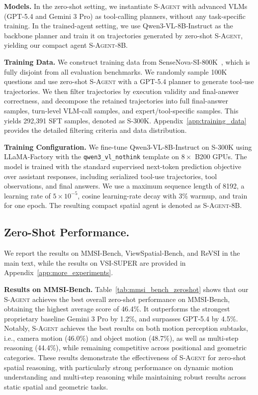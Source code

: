 \textbf{Models.} 
In the zero-shot setting, we instantiate \textsc{S-Agent} with advanced VLMs (GPT-5.4 and Gemini 3 Pro) as tool-calling planners, without any task-specific training. 
In the trained-agent setting, we use Qwen3-VL-8B-Instruct as the backbone planner and train it on trajectories generated by zero-shot \textsc{S-Agent}, yielding our compact agent \textsc{S-Agent-8B}.

\textbf{Training Data.}
We construct training data from SenseNova-SI-800K~\citep{sensenova_si}, which is fully disjoint from all evaluation benchmarks. 
We randomly sample 100K questions and use zero-shot \textsc{S-Agent} with a GPT-5.4 planner to generate tool-use trajectories.
We then filter trajectories by execution validity and final-answer correctness, and decompose the retained trajectories into full final-answer samples, turn-level VLM-call samples, and expert/tool-specific samples. 
This yields 292,391 SFT samples, denoted as \textsc{S-300K}. 
Appendix~\ref{app:training_data} provides the detailed filtering criteria and data distribution.

\textbf{Training Configuration.}
We fine-tune Qwen3-VL-8B-Instruct on \textsc{S-300K} using LLaMA-Factory \citep{zheng2024llamafactory} with the \texttt{qwen3\_vl\_nothink} template on $8\times$ B200 GPUs. 
The model is trained with the standard supervised next-token prediction objective over assistant responses, including serialized tool-use trajectories, tool observations, and final answers. 
We use a maximum sequence length of 8192, a learning rate of $5\times10^{-5}$, cosine learning-rate decay with 3\% warmup, and train for one epoch. 
The resulting compact spatial agent is denoted as \textsc{S-Agent-8B}.



\vspace{-2mm}
\subsection{Zero-Shot Performance.}
\label{sec:experiments:zeroshot}
We report the results on MMSI-Bench, ViewSpatial-Bench, and ReVSI in the main text, while the results on VSI-SUPER are provided in Appendix~\ref{app:more_experiments}.

\textbf{Results on MMSI-Bench.}
Table~\ref{tab:mmsi_bench_zeroshot} shows that our \textsc{S-Agent} achieves the best overall zero-shot performance on MMSI-Bench, obtaining the highest average score of 46.4\%. 
It outperforms the strongest proprietary baseline Gemini 3 Pro by 1.2\%, and surpasses GPT-5.4 by 4.5\%.
Notably, \textsc{S-Agent} achieves the best results on both motion perception subtasks, i.e., camera motion (46.0\%) and object motion (48.7\%), as well as multi-step reasoning (44.4\%), while remaining competitive across positional and geometric categories.
% 
These results demonstrate the effectiveness of \textsc{S-Agent} for zero-shot spatial reasoning, with particularly strong performance on dynamic motion understanding and multi-step reasoning while maintaining robust results across static spatial and geometric tasks.

